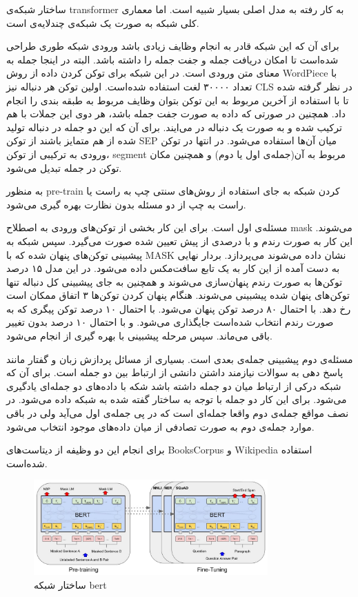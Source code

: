 \documentclass[12pt, a4paper, oneside]{report}
\begin{document}
ساختار شبکه‌ی
transformer
به کار رفته به مدل اصلی بسیار شبیه است. اما معماری کلی شبکه به صورت یک شبکه‌ی چندلایه‌ی
است. 

برای آن که این شبکه قادر به انجام وظایف زیادی باشد ورودی شبکه طوری طراحی شده‌است تا امکان دریافت جمله و جفت جمله
را داشته باشد. البته در اینجا جمله به معنای متن ورودی است.
در این شبکه برای توکن کردن داده از روش
WordPiece
با تعداد ۳۰۰۰۰ لغت استفاده شده‌است. اولین توکن هر دنباله نیز
CLS
در نظر گرفته شده تا با استفاده از آخرین
مربوط به این توکن بتوان وظایف مربوط به طبقه بندی را انجام داد.
همچنین در صورتی که داده به صورت جفت جمله باشد، هر دوی این جملات با هم ترکیب شده و به صورت یک دنباله در می‌ایند.
برای آن که این دو جمله در دنباله تولید شده از هم متمایز باشند از توکن
SEP
میان آن‌ها استفاده می‌شود. در انتها در توکن ورودی به ترکیبی از توکن،
segment
مربوط به آن(جمله‌ی اول یا دوم)
و همچنین مکان توکن در جمله تبدیل می‌شود.

به منظور
pre-train
کردن شبکه‌ به جای استفاده از روش‌های سنتی چپ به راست یا راست به چپ از دو مسئله بدون نظارت بهره گیری می‌شود.

مسئله‌ی اول
است. برای این کار بخشی از توکن‌های ورودی به اصطلاح
mask
می‌شوند. این کار به صورت رندم و با درصدی از پیش تعیین شده صورت می‌گیرد. سپس شبکه به پیشبینی توکن‌های پنهان شده
که با 
MASK
نشان داده می‌شوند می‌پردازد. بردار نهایی به دست آمده از این کار به یک تابع
سافت‌مکس
داده می‌شود. در این مدل ۱۵ درصد توکن‌ها به صورت رندم پنهان‌سازی می‌شوند و همچنین به جای پیشبینی کل دنباله تنها
توکن‌های پنهان شده پیشبینی می‌شوند. هنگام پنهان کردن توکن‌ها ۳ اتفاق ممکان است رخ دهد. با احتمال ۸۰ درصد توکن
پنهان می‌شود. با احتمال ۱۰ درصد توکن پیگری که به صورت رندم انتخاب شده‌است جایگذاری می‌شود. و با احتمال ۱۰ درصد
بدون تغییر باقی می‌ماند. سپس مرحله پیشبینی با بهره گیری از
انجام می‌شود.

مسئله‌ی دوم پیشبینی جمله‌ی بعدی است. بسیاری از مسائل پردازش زبان و گفتار مانند پاسخ دهی به سوالات نیازمند داشتن
دانشی از ارتباط بین دو جمله است. برای آن که شبکه درکی از ارتباط میان دو جمله داشته باشد شکه با داده‌های دو جمله‌ای
یادگیری می‌شود. برای این کار دو جمله با توجه به ساختار گفته شده به شبکه داده می‌شود. در نصف مواقع جمله‌ی دوم
واقعا جمله‌ای است که در پی جمله‌ی اول می‌آید ولی در باقی موارد جمله‌ی دوم به صورت تصادفی از میان داده‌های موجود
انتخاب می‌شود.

برای انجام این دو وظیفه از دیتاست‌های
BooksCorpus
و
Wikipedia
استفاده شده‌است. 

\begin{figure}[!ht]
    \centering
    \includegraphics[width=0.8\textwidth]{bert}
    \caption{ ساختار شبکه bert }
    \label{fig:bert}
\end{figure}
\end{document}
